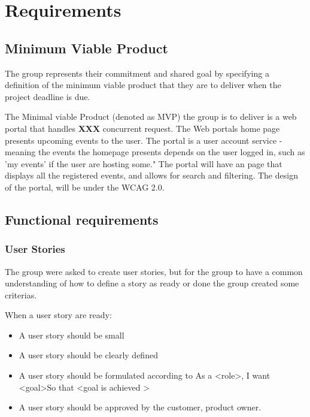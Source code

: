 
\chapter{Requirements}

\section{Minimum Viable Product}
\label{MVP}
The group represents their commitment and shared goal by specifying a definition of the minimum viable product that they are to deliver when the project deadline is due.

The Minimal viable Product (denoted as MVP) the group is to deliver is a web portal that handles 
\textbf{XXX} concurrent request. The Web portals home page presents upcoming events to the user. The portal is a user account service - meaning the events the homepage presents depends on the user logged in, such as 'my events'  if the user are hosting some." \newline
The portal will have an page that displays all the registered events, and allows for search and filtering. 
The design of the portal, will be under the WCAG 2.0.

\section{Functional requirements}
\subsection{User Stories}
The group were asked to create user stories, but for the group to have a common understanding of how to define a story as ready or done the group created some criterias. 

\begin{description}
    \item[When a user story are ready:]
\end{description}
\begin{itemize}[noitemsep]
    \item A user story should be small
    \item A user story should be clearly defined
    \item A user story should be formulated according to As a \textless role\textgreater, I want \textless goal\textgreater So that \textless goal is achieved \textgreater
    \item A user story should be approved by the customer, product owner.
\end{itemize}

